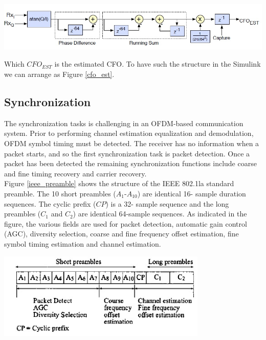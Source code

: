 \begin{center}
\includegraphics[width=\textwidth]{content/fig/cfo_est.JPG}
\label{cfo_est}
\end{center}

Which $CFO_{EST}$ is the estimated CFO. To have such the structure in the Simulink we can arrange as Figure \ref{cfo_est}.

\subsection{Synchronization}
\label{section:sync}

The synchronization tasks is challenging in an OFDM-based communication system. Prior to performing channel estimation equalization and demodulation, OFDM symbol timing must be detected. The receiver has no information when a packet starts, and so the first synchronization task is packet detection. Once a packet has been detected the remaining synchronization functions include coarse and fine timing recovery and carrier recovery.\\
Figure \ref{ieee_preamble} shows the structure of the IEEE 802.1la standard preamble. The 10 short preambles ($A_{1}$-$A_{10}$) are identical 16- sample duration sequences. The cyclic prefix ($CP$) is a 32- sample sequence and the long preambles ($C_{1}$ and $C_{2}$) are identical 64-sample sequences. As indicated in the figure, the various fields are used for packet detection, automatic gain control (AGC), diversity selection, coarse and fine frequency offset estimation, fine symbol timing estimation and channel estimation.\\

\begin{center}
\includegraphics[width=10cm]{content/fig/ieee_preamble.JPG}
\label{ieee_preamble}
\end{center}

